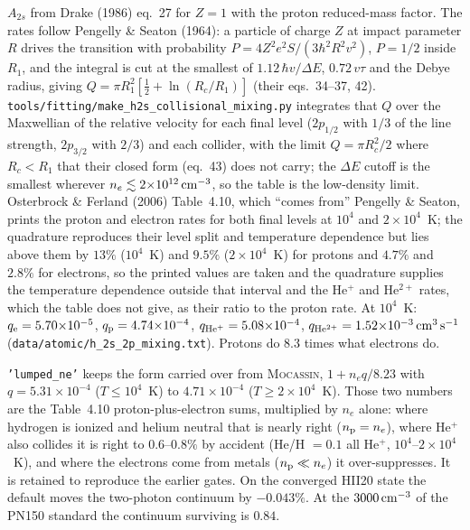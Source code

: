 \documentclass[english,a4paper]{my_memo}
\newcommand{\code}[1]{\texttt{#1}}
\begin{document}
$A_{2s}$ from Drake (1986) eq.~27 for $Z=1$ with the proton reduced-mass
factor.  The rates follow Pengelly \& Seaton (1964): a particle of charge
$Z$ at impact parameter $R$ drives the transition with probability
$P = 4Z^2e^2S/(3\hbar^2R^2v^2)$, $P = 1/2$ inside $R_1$, and the
integral is cut at the smallest of $1.12\,\hbar v/\Delta E$, $0.72\,v\tau$
and the Debye radius, giving $Q = \pi R_1^2[\frac12 + \ln(R_c/R_1)]$
(their eqs.~34--37, 42).  \code{tools/fitting/make\_h2s\_collisional\_mixing.py}
integrates that $Q$ over the Maxwellian of the relative velocity for each
final level ($2p_{1/2}$ with $1/3$ of the line strength, $2p_{3/2}$ with
$2/3$) and each collider, with the limit $Q = \pi R_c^2/2$ where
$R_c < R_1$ that their closed form (eq.~43) does not carry; the $\Delta E$
cutoff is the smallest wherever $n_e \lesssim 2{\times}10^{12}\,{\rm
cm^{-3}}$, so the table is the low-density limit.  Osterbrock \& Ferland
(2006) Table~4.10, which ``comes from'' Pengelly \& Seaton, prints the
proton and electron rates for both final levels at $10^4$ and
$2{\times}10^4$~K; the quadrature reproduces their level split and
temperature dependence but lies above them by $13\%$ ($10^4$~K) and $9.5\%$
($2{\times}10^4$~K) for protons and $4.7\%$ and $2.8\%$ for electrons, so
the printed values are taken and the quadrature
supplies the temperature dependence outside that interval and the He$^+$
and He$^{2+}$ rates, which the table does not give, as their ratio to the
proton rate.  At $10^4$~K: $q_{\rm e} = 5.70{\times}10^{-5}$,
$q_{\rm p} = 4.74{\times}10^{-4}$, $q_{\rm He^+} = 5.08{\times}10^{-4}$,
$q_{\rm He^{2+}} = 1.52{\times}10^{-3}\,{\rm cm^3\,s^{-1}}$
(\code{data/atomic/h\_2s\_2p\_mixing.txt}).  Protons do $8.3$ times what
electrons do.

\code{'lumped\_ne'} keeps the form carried over from \textsc{Mocassin},
$1 + n_e q/8.23$ with $q = 5.31{\times}10^{-4}$ ($T \le 10^4$~K) to
$4.71{\times}10^{-4}$ ($T \ge 2{\times}10^4$~K).  Those two numbers are the
Table~4.10 proton-plus-electron sums, multiplied by $n_e$ alone: where
hydrogen is ionized and helium neutral that is nearly right ($n_{\rm p} =
n_e$), where He$^+$ also collides it is right to $0.6$--$0.8\%$ by accident
(He/H $= 0.1$ all He$^+$, $10^4$--$2{\times}10^4$~K), and
where the electrons come from metals ($n_{\rm p} \ll n_e$) it over-suppresses.
It is retained to reproduce the earlier gates.  On the converged HII20
state the default moves the two-photon continuum by $-0.043\%$.  At the
$3000\,{\rm cm^{-3}}$ of the PN150 standard the continuum surviving is
$0.84$.
\end{document}
